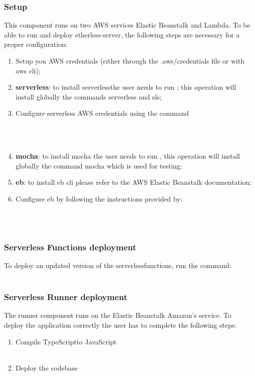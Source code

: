 \subsubsection{Setup}
This component runs on two AWS services Elastic Beanstalk and Lambda.
To be able to run and deploy etherless-server, the following steps are necessary for a proper configuration:
\begin{enumerate}
	\item Setup you AWS credentials (either through the .aws/credentials file or with aws cli);
	\item \textbf{serverless}: to install serverless\glo the user needs to run ; this operation will install globally the commands serverless and sls;
	\item Configure serverless AWS credentials using the command\\\\\centerline{}\\
    \item \textbf{mocha}: to install mocha the user needs to run , this operation will install globally the command mocha which is used for testing;
    \item \textbf{eb}: to install eb cli please refer to the AWS Elastic Beanstalk documentation;
    \item Configure eb by following the instructions provided by: \\\\\centerline{}\\

\end{enumerate}
\subsubsection{Serverless Functions deployment}
To deploy an updated version of the serverless\glo functions, run the command:
\\\\ \centerline{}
\subsubsection{Serverless Runner deployment}
The runner component runs on the Elastic Beanstalk Amazon's service. To deploy the application correctly the user has to complete the following steps:
\begin{enumerate}
	\item Compile TypeScript\glo to JavaScript\glo \\\\ \centerline{}
	\item Deploy the codebase \\\\ \centerline{}
\end{enumerate}
